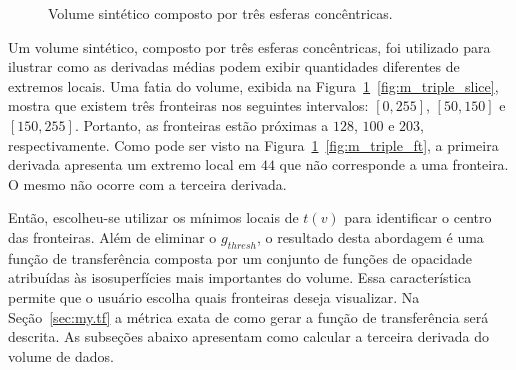 \begin{figure}
	\centering
	\caption{Volume sintético composto por três esferas concêntricas.}
	\label{fig:m_triple}
\end{figure}
	
	Um volume sintético, composto por três esferas concêntricas, foi utilizado para ilustrar como as derivadas médias podem exibir quantidades diferentes de extremos locais. Uma fatia do volume, exibida na Figura~\ref{fig:m_triple}~\ref{fig:m_triple_slice}, mostra que existem três fronteiras nos seguintes intervalos: $ [0,255] $, $ [50,150] $ e $ [150,255] $. Portanto, as fronteiras estão próximas a $ 128 $, $ 100 $ e $ 203 $, respectivamente. Como pode ser visto na Figura~\ref{fig:m_triple}~\ref{fig:m_triple_ft}, a primeira derivada apresenta um extremo local em $ 44 $ que não corresponde a uma fronteira. O mesmo não ocorre com a terceira derivada.
	
	Então, escolheu-se utilizar os mínimos locais de $ t(v) $ para identificar o centro das fronteiras. Além de eliminar o $ g_{thresh} $, o resultado desta abordagem é uma função de transferência composta por um conjunto de funções de opacidade atribuídas às isosuperfícies mais importantes do volume. Essa característica permite que o usuário escolha quais fronteiras deseja visualizar. Na Seção~\ref{sec:my.tf} a métrica exata de como gerar a função de transferência será descrita. As subseções abaixo apresentam como calcular a terceira derivada do volume de dados.
	
